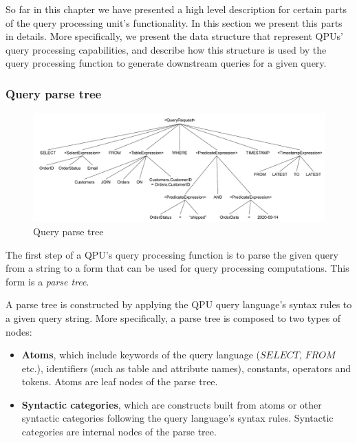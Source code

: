 So far in this chapter we have presented a high level description for certain parts of the query processing unit's
functionality.
In this section we present this parts in details.
More specifically, we present the data structure that represent QPUs' query processing capabilities,
and describe how this structure is used by the query processing function to generate downstream queries for a given query.

\subsubsection{Query parse tree}

\begin{figure}[t]
  \centering
    \includegraphics[width=\textwidth]{./figures/design_pattern/parse_tree.pdf}
  \caption{Query parse tree}
  \label{fig:parse_tree}
\end{figure}

The first step of a QPU's query processing function is to parse the given query from a string to a form that can be used
for query processing computations.
This form is a \textit{parse tree}.

A parse tree is constructed by applying the QPU query language's syntax rules to a given query string.
More specifically, a parse tree is composed to two types of nodes:

\begin{itemize}
  \item \textbf{Atoms}, which include keywords of the query language ($SELECT$, $FROM$ etc.),
  identifiers (such as table and attribute names), constants, operators and tokens.
  Atoms are leaf nodes of the parse tree.

  \item \textbf{Syntactic categories}, which are constructs built from atoms or other syntactic categories
  following the query language's syntax rules.
  Syntactic categories are internal nodes of the parse tree.
\end{itemize}

